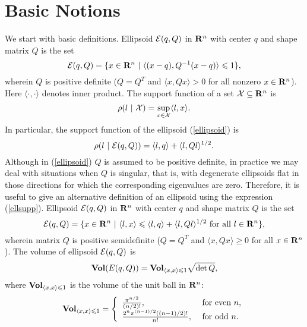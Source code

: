 \section{Basic Notions}
We start with basic definitions.
\bd
Ellipsoid $\EE(q,Q)$ in ${\bf R}^n$ with  center $q$
and  shape matrix $Q$ is the set
\begin{equation}
\EE(q,Q) = \{ x \in {\bf R}^n ~|~ \langle (x-q), Q^{-1}(x-q)\rangle\leq1 \},
\label{ellipsoid}
\end{equation}
wherein  $Q$ is positive definite ($Q=Q^T$ and $\langle x, Qx\rangle>0$
for all nonzero $x\in{\bf R}^n$).
\label{ellipsoiddef0}
\ed
Here $\langle\cdot,\cdot\rangle$ denotes inner product.
\bd
The support function of a set $\XX\subseteq{\bf R}^n$ is
\[ \rho(l~|~\XX) = \sup_{x\in\XX} \langle l,x\rangle. \]
\ed
In particular, the support function of the ellipsoid (\ref{ellipsoid}) is
\begin{equation}
\rho(l~|~\EE(q,Q)) = \langle l, q\rangle + \langle l, Ql\rangle^{1/2}.
\label{ellsupp}
\end{equation}
Although in (\ref{ellipsoid}) $Q$ is assumed to be
positive definite, in practice we may deal with situations when $Q$ is
singular, that is, with degenerate ellipsoids flat in those directions
for which the corresponding eigenvalues are zero. Therefore, it is
useful to give an alternative definition of an ellipsoid using the
expression (\ref{ellsupp}).
\bd
Ellipsoid $\EE(q,Q)$ in ${\bf R}^n$ with  center $q$
and  shape matrix $Q$ is the set
\begin{equation}
\EE(q,Q) = \{ x \in {\bf R}^n ~|~
\langle l,x\rangle\leq\langle l,q\rangle + \langle l,Ql\rangle^{1/2}
\mbox{ for all } l\in{\bf R}^n \},
\label{ellipsoid2}
\end{equation}
wherein matrix $Q$ is positive semidefinite
($Q=Q^T$ and $\langle x, Qx\rangle\geq0$ for all $x\in{\bf R}^n$).
\label{ellipsoiddef}
\ed
The volume of ellipsoid $\EE(q,Q)$ is
\begin{equation}
{\bf Vol}(E(q,Q)) = {\bf Vol}_{\langle x,x\rangle\leq1}\sqrt{\det Q},
\label{ellvolume}
\end{equation}
where ${\bf Vol}_{\langle x,x\rangle\leq 1}$ is the volume of the unit ball
in ${\bf R}^n$:
\begin{equation}
{\bf Vol}_{\langle x,x\rangle\leq 1} = \left\{\begin{array}{ll}
\frac{\pi^{n/2}}{(n/2)!}, &
\mbox{ for even } n,\\
\frac{2^n\pi^{(n-1)/2}\left((n-1)/2\right)!}{n!}, &
\mbox{ for odd } n. \end{array}\right.
\label{ellunitball}
\end{equation}

